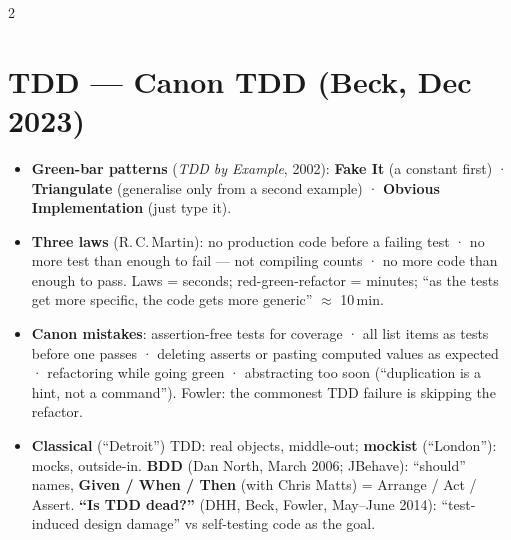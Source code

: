 \documentclass[8pt]{extarticle}
\begin{document}
\begin{multicols}{2}
\section{TDD — Canon TDD (Beck, Dec 2023)}
\noindent{}
\begin{itemize}
  \item \textbf{Green-bar patterns} (\emph{TDD by Example}, 2002): \textbf{Fake It} (a constant
        first) · \textbf{Triangulate} (generalise only from a second example) · \textbf{Obvious
        Implementation} (just type it).
  \item \textbf{Three laws} (R.\,C.\,Martin): no production code before a failing test · no more
        test than enough to fail — not compiling counts · no more code than enough to pass.
        Laws = seconds; red-green-refactor = minutes; ``as the tests get more specific, the code
        gets more generic'' $\approx$ 10\,min.
  \item \textbf{Canon mistakes}: assertion-free tests for coverage · all list items as tests
        before one passes · deleting asserts or pasting computed values as expected ·
        refactoring while going green · abstracting too soon (``duplication is a hint, not a
        command''). Fowler: the commonest TDD failure is skipping the refactor.
  \item \textbf{Classical} (``Detroit'') TDD: real objects, middle-out; \textbf{mockist}
        (``London''): mocks, outside-in. \textbf{BDD} (Dan North, March 2006; JBehave):
        ``should'' names, \textbf{Given / When / Then} (with Chris Matts) = Arrange / Act /
        Assert. \textbf{``Is TDD dead?''} (DHH, Beck, Fowler, May–June 2014):
        ``test-induced design damage'' vs self-testing code as the goal.
\end{itemize}


\end{multicols}
\end{document}

